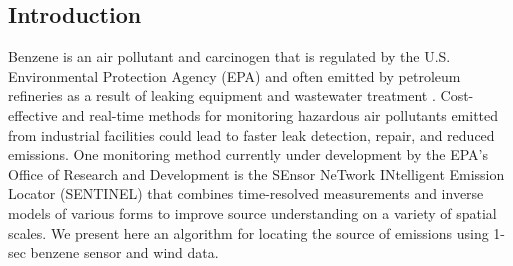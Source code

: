\documentclass[a0, landscape]{a0poster}
\begin{document}
\begin{multicols}{3} %




\section*{Introduction}
Benzene is an air pollutant and carcinogen that is regulated by the U.S. Environmental Protection Agency (EPA) and often emitted by petroleum refineries as a result of leaking equipment and wastewater treatment \cite{fencelinerule}. Cost-effective and real-time methods for monitoring hazardous air pollutants emitted from industrial facilities could lead to faster leak detection, repair, and reduced emissions. One monitoring method currently under development by the EPA's Office of Research and Development is the SEnsor NeTwork INtelligent Emission Locator (SENTINEL) that combines time-resolved measurements and inverse models of various forms to improve source understanding on a variety of spatial scales. We present here an algorithm for locating the source of emissions using 1-sec benzene sensor and wind data.  
\vspace{10pt}


\end{multicols}
\end{document}
